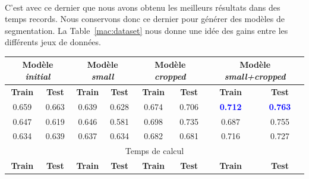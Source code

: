 \documentclass[a4paper,12pt]{report}
\newcommand{\tabref}[1]{Table~\ref{#1}}
\newcommand{\blue}[1]{\textcolor{blue}{#1}}
\begin{document}
\

C'est avec ce dernier que nous avons obtenu les meilleurs résultats dans des temps records. Nous conservons donc ce dernier pour générer des modèles de segmentation. La \tabref{mac:dataset} nous donne une idée des gains entre les différents jeux de données.

\begin{table}[!ht]
    \centering
    \renewcommand{\arraystretch}{1.2}
    \begin{tabular}{|c|c|c|c|c|c|c|c|}
        \hline
        \multicolumn{2}{|c}{Modèle \textit{initial}} & \multicolumn{2}{|c}{Modèle \textit{small}} & \multicolumn{2}{|c}{Modèle \textit{cropped}} & \multicolumn{2}{|c|}{Modèle \textit{small+cropped}}                                                                                  \\ \hline
        \textbf{Train}                               & \textbf{Test}                              & \textbf{Train}                               & \textbf{Test}                                       & \textbf{Train} & \textbf{Test} & \textbf{Train}        & \textbf{Test}         \\ \hline
        0.659                                        & 0.663                                      & 0.639                                        & 0.628                                               & 0.674          & 0.706         & \blue{\textbf{0.712}} & \blue{\textbf{0.763}} \\\hline
        0.647                                        & 0.619                                      & 0.646                                        & 0.581                                               & 0.698          & 0.735         & 0.687                 & 0.755                 \\\hline
        0.634                                        & 0.639                                      & 0.637                                        & 0.634                                               & 0.682          & 0.681         & 0.716                 & 0.727                 \\\hline
        \multicolumn{8}{|c|}{Temps de calcul}                                                                                                                                                                                                                                           \\ \hline
        \textbf{Train}                               & \textbf{Test}                              & \textbf{Train}                               & \textbf{Test}                                       & \textbf{Train} & \textbf{Test} & \textbf{Train}        & \textbf{Test}         \\ \hline

\end{tabular}
\end{table}
\end{document}
